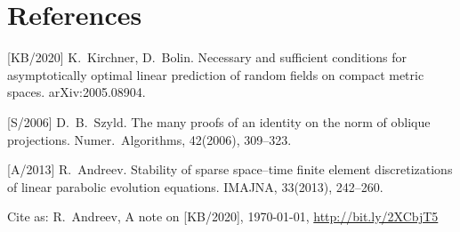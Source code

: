 \documentclass[12pt]{article}
\renewcommand{\title}{A note on [KB/2020]}
\begin{document}
	

	\section*{References}

	[KB/2020]
	K.~Kirchner, D.~Bolin.
	Necessary and sufficient conditions for asymptotically optimal linear prediction of random fields on compact metric spaces.
	arXiv:2005.08904.
	
	[S/2006]
	D.~B.~Szyld.
	The many proofs of an identity on the norm of oblique projections.
	Numer.~Algorithms, 42(2006), 309--323.
	
	[A/2013]
	R.~Andreev.
	Stability of sparse space--time finite element discretizations of linear parabolic
	evolution equations.
	IMAJNA, 33(2013), 242--260.
	
	\vfill
	Cite as:
	R.~Andreev, 
	\title, \today,
	\url{http://bit.ly/2XCbjT5}
\end{document}
